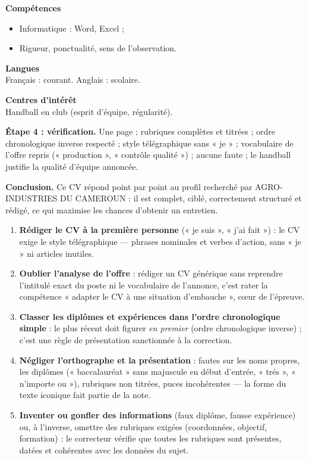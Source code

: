 \documentclass[11pt]{article}
\newcommand{\cle}[1]{{\popxbold\color{popdark}#1}}
\begin{document}
\begin{exoresolu}
\textbf{Compétences}
\begin{itemize}
\item Informatique : Word, Excel ;
\item Rigueur, ponctualité, sens de l'observation.
\end{itemize}

\textbf{Langues}\\
Français : courant. Anglais : scolaire.

\textbf{Centres d'intérêt}\\
Handball en club (esprit d'équipe, régularité).

\textbf{Étape 4 : vérification.} Une page ; rubriques complètes et titrées ; ordre chronologique inverse respecté ; style télégraphique sans « je » ; vocabulaire de l'offre repris (« production », « contrôle qualité ») ; aucune faute ; le handball justifie la qualité d'équipe annoncée.

\textbf{Conclusion.} Ce CV répond point par point au profil recherché par AGRO-INDUSTRIES DU CAMEROUN : il est complet, ciblé, correctement structuré et rédigé, ce qui maximise les chances d'obtenir un entretien.
\end{exoresolu}

\begin{attention}
\begin{enumerate}
\item \textbf{Rédiger le CV à la première personne} (« je suis », « j'ai fait ») : le CV exige le \cle{style télégraphique} — phrases nominales et verbes d'action, sans « je » ni articles inutiles.
\item \textbf{Oublier l'analyse de l'offre} : rédiger un CV générique sans reprendre l'intitulé exact du poste ni le vocabulaire de l'annonce, c'est rater la compétence « adapter le CV à une situation d'embauche », cœur de l'épreuve.
\item \textbf{Classer les diplômes et expériences dans l'ordre chronologique simple} : le plus récent doit figurer \emph{en premier} (ordre chronologique inverse) ; c'est une règle de présentation sanctionnée à la correction.
\item \textbf{Négliger l'orthographe et la présentation} : fautes sur les noms propres, les diplômes (« baccalauréat » sans majuscule en début d'entrée, « trés », « n'importe ou »), rubriques non titrées, puces incohérentes — la forme du texte iconique fait partie de la note.
\item \textbf{Inventer ou gonfler des informations} (faux diplôme, fausse expérience) ou, à l'inverse, omettre des rubriques exigées (coordonnées, objectif, formation) : le correcteur vérifie que toutes les rubriques sont présentes, datées et cohérentes avec les données du sujet.
\end{enumerate}
\end{attention}
\end{document}
